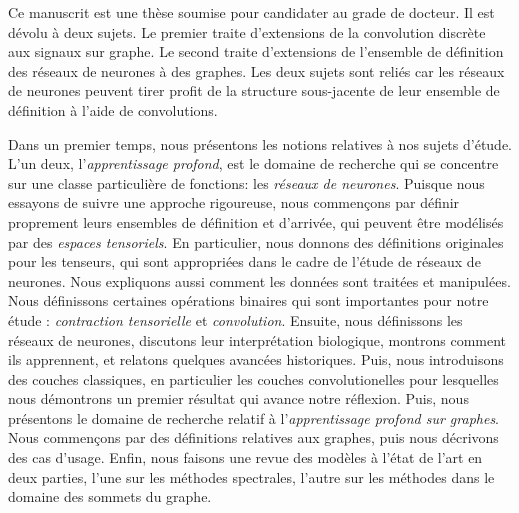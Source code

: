 Ce manuscrit est une thèse soumise pour candidater au grade de docteur. Il est dévolu à deux sujets. Le premier traite d'extensions de la convolution discrète aux signaux sur graphe. Le second traite d'extensions de l'ensemble de définition des réseaux de neurones à des graphes. Les deux sujets sont reliés car les réseaux de neurones peuvent tirer profit de la structure sous-jacente de leur ensemble de définition à l'aide de convolutions.

Dans un premier temps, nous présentons les notions relatives à nos sujets d'étude. L'un deux, l'\emph{apprentissage profond}, est le domaine de recherche qui se concentre sur une classe particulière de fonctions: les \emph{réseaux de neurones}. Puisque nous essayons de suivre une approche rigoureuse, nous commençons par définir proprement leurs ensembles de définition et d'arrivée, qui peuvent être modélisés par des \emph{espaces tensoriels}. En particulier, nous donnons des définitions originales pour les tenseurs, qui sont appropriées dans le cadre de l'étude de réseaux de neurones. Nous expliquons aussi comment les données sont traitées et manipulées. Nous définissons certaines opérations binaires qui sont importantes pour notre étude : \emph{contraction tensorielle} et \emph{convolution}. Ensuite, nous définissons les réseaux de neurones, discutons leur interprétation biologique, montrons comment ils apprennent, et relatons quelques avancées historiques. Puis, nous introduisons des couches classiques, en particulier les couches convolutionelles pour lesquelles nous démontrons un premier résultat qui avance notre réflexion. Puis, nous présentons le domaine de recherche relatif à l'\emph{apprentissage profond sur graphes}. Nous commençons par des définitions relatives aux graphes, puis nous décrivons des cas d'usage. Enfin, nous faisons une revue des modèles à l'état de l'art en deux parties, l'une sur les méthodes spectrales, l'autre sur les méthodes dans le domaine des sommets du graphe.

